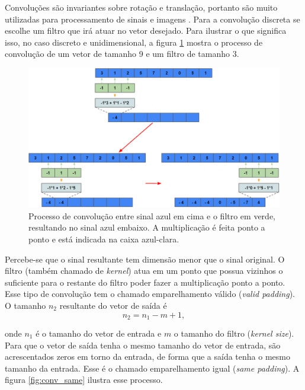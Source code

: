 \documentclass[a4paper,12pt,oneside]{book}
\begin{document}
\par Convoluções são invariantes sobre rotação e translação, portanto são muito utilizadas para processamento de sinais e imagens \cite{signal_book}. Para a convolução discreta se escolhe um filtro que irá atuar no vetor desejado. Para ilustrar o que significa isso, no caso discreto e unidimensional, a figura \ref{fig:conv_valid} mostra o processo de convolução de um vetor de tamanho 9 e um filtro de tamanho 3.

\begin{figure}[H]
    \centering
    \includegraphics[scale = 0.38]{figs/conv_valid.png}
    \caption{Processo de convolução entre sinal azul em cima e o filtro em verde, resultando no sinal azul embaixo. A multiplicação é feita ponto a ponto e está indicada na caixa azul-clara.}
    \label{fig:conv_valid}
\end{figure}

\par Percebe-se que o sinal resultante tem dimensão menor que o sinal original. O filtro (também chamado de \textit{kernel}) atua em um ponto que possua vizinhos o suficiente para o restante do filtro poder fazer a multiplicação ponto a ponto. Esse tipo de convolução tem o chamado emparelhamento válido (\textit{valid padding}). O tamanho $n_2$ resultante do vetor de saída é 
\begin{equation}
    n_2 = n_1 - m + 1,
\end{equation}

\par onde $n_1$ é o tamanho do vetor de entrada e $m$ o tamanho do filtro (\textit{kernel size}). Para que o vetor de saída tenha o mesmo tamanho do vetor de entrada, são acrescentados zeros em torno da entrada, de forma que a saída tenha o mesmo tamanho da entrada. Esse é o chamado emparelhamento igual (\textit{same padding}). A figura \ref{fig:conv_same} ilustra esse processo.
\end{document}
